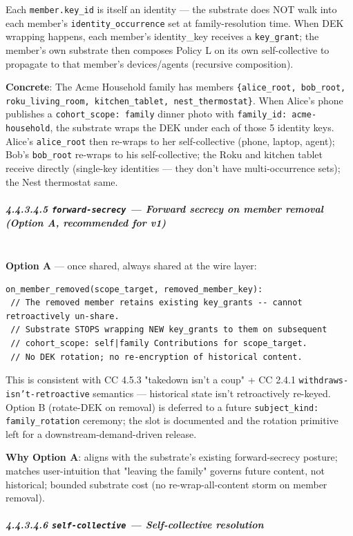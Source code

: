\documentclass[11pt]{article}
\begin{document}
Each \texttt{member.key\_id} is itself an identity — the substrate does NOT walk into each member's \texttt{identity\_occurrence} set at family-resolution time. When DEK wrapping happens, each member's identity\_key receives a \texttt{key\_grant}; the member's own substrate then composes Policy L on its own self-collective to propagate to that member's devices/agents (recursive composition).


\textbf{Concrete}: The Acme Household family has members \texttt{\{alice\_root, bob\_root, roku\_living\_room, kitchen\_tablet, nest\_thermostat\}}. When Alice's phone publishes a \texttt{cohort\_scope: family} dinner photo with \texttt{family\_id: acme-household}, the substrate wraps the DEK under each of those 5 identity keys. Alice's \texttt{alice\_root} then re-wraps to her self-collective (phone, laptop, agent); Bob's \texttt{bob\_root} re-wraps to his self-collective; the Roku and kitchen tablet receive directly (single-key identities — they don't have multi-occurrence sets); the Nest thermostat same.


\subparagraph{4.4.3.4.5 \texttt{forward-secrecy} — Forward secrecy on member removal (Option A, recommended for v1)}\mbox{}\\


\textbf{Option A} — once shared, always shared at the wire layer:


\begin{lstlisting}
on_member_removed(scope_target, removed_member_key):
 // The removed member retains existing key_grants -- cannot retroactively un-share.
 // Substrate STOPS wrapping NEW key_grants to them on subsequent
 // cohort_scope: self|family Contributions for scope_target.
 // No DEK rotation; no re-encryption of historical content.
\end{lstlisting}

This is consistent with CC 4.5.3 "takedown isn't a coup" + CC 2.4.1 \texttt{withdraws-isn't-retroactive} semantics — historical state isn't retroactively re-keyed. Option B (rotate-DEK on removal) is deferred to a future \texttt{subject\_kind: family\_rotation} ceremony; the slot is documented and the rotation primitive left for a downstream-demand-driven release.


\textbf{Why Option A}: aligns with the substrate's existing forward-secrecy posture; matches user-intuition that "leaving the family" governs future content, not historical; bounded substrate cost (no re-wrap-all-content storm on member removal).


\subparagraph{4.4.3.4.6 \texttt{self-collective} — Self-collective resolution}\mbox{}\\
\end{document}
